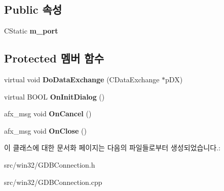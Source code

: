\subsection*{Public 속성}
\begin{DoxyCompactItemize}
\item 
\mbox{\label{class_g_d_b_waiting_dlg_a3acb8dcd210dc9bb20df25b0ebb6dc4e}} 
C\+Static {\bfseries m\+\_\+port}
\end{DoxyCompactItemize}
\subsection*{Protected 멤버 함수}
\begin{DoxyCompactItemize}
\item 
\mbox{\label{class_g_d_b_waiting_dlg_af600ff1c657c7db6c325a5276328a4a0}} 
virtual void {\bfseries Do\+Data\+Exchange} (C\+Data\+Exchange $\ast$p\+DX)
\item 
\mbox{\label{class_g_d_b_waiting_dlg_a9709c0dd18068bfc9f3e9b0c06f1b6d6}} 
virtual B\+O\+OL {\bfseries On\+Init\+Dialog} ()
\item 
\mbox{\label{class_g_d_b_waiting_dlg_a5838b8b0663a918e2ceaaa2018ed29ae}} 
afx\+\_\+msg void {\bfseries On\+Cancel} ()
\item 
\mbox{\label{class_g_d_b_waiting_dlg_a9f08e30520f95b333ba224ebd41c47e3}} 
afx\+\_\+msg void {\bfseries On\+Close} ()
\end{DoxyCompactItemize}


이 클래스에 대한 문서화 페이지는 다음의 파일들로부터 생성되었습니다.\+:\begin{DoxyCompactItemize}
\item 
src/win32/G\+D\+B\+Connection.\+h\item 
src/win32/G\+D\+B\+Connection.\+cpp\end{DoxyCompactItemize}
